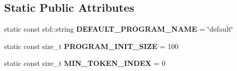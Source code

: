 \subsection*{Static Public Attributes}
\begin{DoxyCompactItemize}
\item 
\mbox{\label{classantlr4_1_1TokenStreamRewriter_a66ff5231eb3eefa28f6299e492d0e525}} 
static const std\+::string {\bfseries D\+E\+F\+A\+U\+L\+T\+\_\+\+P\+R\+O\+G\+R\+A\+M\+\_\+\+N\+A\+ME} = \char`\"{}default\char`\"{}
\item 
\mbox{\label{classantlr4_1_1TokenStreamRewriter_a491e0add76852f54c74212e9f0613b3b}} 
static const size\+\_\+t {\bfseries P\+R\+O\+G\+R\+A\+M\+\_\+\+I\+N\+I\+T\+\_\+\+S\+I\+ZE} = 100
\item 
\mbox{\label{classantlr4_1_1TokenStreamRewriter_aad1af114e78fec76331de4c8c6dca273}} 
static const size\+\_\+t {\bfseries M\+I\+N\+\_\+\+T\+O\+K\+E\+N\+\_\+\+I\+N\+D\+EX} = 0
\end{DoxyCompactItemize}

